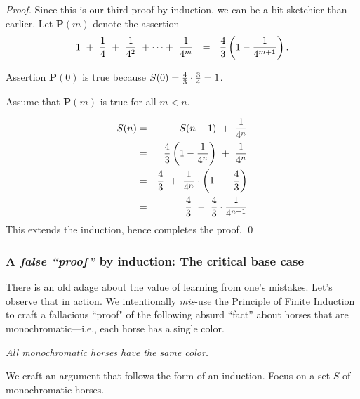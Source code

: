 \begin{proof}
Since this is our third proof by induction, we can be a bit sketchier than earlier.  Let {\bf P}$(m)$ 
denote the assertion
\[ 1 \ + \ {1 \over 4} \ + \ {1 \over 4^2} \ + \cdots + \ {1 \over 4^m}
\ \ = \ \  {4 \over 3} \left(1 - {1 \over 4^{m+1}} \right).
\]

\smallskip

Assertion {\bf P}$(0)$ is true because $S(0) = {4 \over 3} \cdot {3 \over 4} = 1$.

\medskip

Assume that {\bf P}$(m)$ is true for all $m < n$.

\medskip

\begin{eqnarray*}
S(n) & = & S(n-1) \ + \ {1 \over 4^n} \\
        & = & {4 \over 3} \left(1 - {1 \over 4^{n}} \right) \ + \ {1 \over 4^{n}} \\
        & = & {4 \over 3} \ + \ {1 \over 4^n} \cdot \left( 1  \ - \  {4 \over 3} \right) \\
        & = & {4 \over 3} \ - \ {4 \over 3} \cdot {1 \over 4^{n+1}}
\end{eqnarray*}
This extends the induction, hence completes the proof.
\qed
\end{proof}


\subsubsection{A {\em false ``proof''} by induction: The critical base case}
\label{sec:false-induction}

There is an old adage about the value of learning from one's mistakes.  Let's observe that in action.  We intentionally {\em mis}-use the Principle of Finite Induction to craft a fallacious ``proof" of the following absurd ``fact'' about horses that are monochromatic---i.e., each horse has a single color.

\medskip

{\em All monochromatic horses have the same color.}

\medskip

We craft an argument that follows the form of an induction.  Focus on a set $S$ of monochromatic horses.

\smallskip

